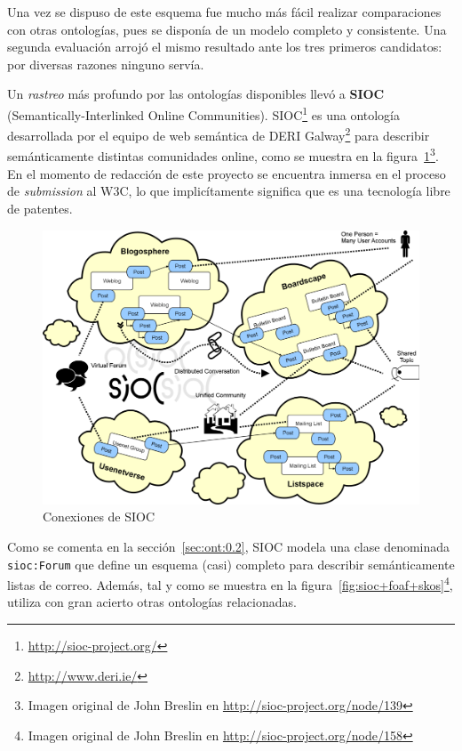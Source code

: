 Una vez se dispuso de este esquema fue mucho más fácil realizar comparaciones
con otras ontologías, pues se disponía de un modelo completo y consistente. Una 
segunda evaluación arrojó el mismo resultado ante los tres primeros candidatos:
por diversas razones ninguno servía.

Un \emph{rastreo} más profundo por las ontologías disponibles llevó a 
\textbf{SIOC}\cite{Breslin2005} (Semantically-Interlinked Online Communities). 
SIOC\footnote{\url{http://sioc-project.org/}} es una ontología desarrollada 
por el equipo de web semántica de DERI Galway\footnote{\url{http://www.deri.ie/}} 
para describir semánticamente distintas comunidades online, como se muestra en
la figura~\ref{fig:siocCloud}\footnote{Imagen original de John Breslin en 
\url{http://sioc-project.org/node/139}}. En el momento de redacción
de este proyecto se encuentra inmersa en el proceso de \emph{submission} al
W3C, lo que implicítamente significa que es una tecnología libre de patentes.

\begin{figure}[H]
	\centering
	\includegraphics[width=12cm]{images/sioc-clouds.png}
	\caption{Conexiones de SIOC}
	\label{fig:siocCloud}
\end{figure}

Como se comenta en la sección~\ref{sec:ont:0.2}, SIOC modela una clase denominada
\texttt{sioc:Forum} que define un esquema (casi) completo para describir
semánticamente listas de correo. Además, tal y como se muestra en la 
figura~\ref{fig:sioc+foaf+skos}\footnote{Imagen original de John Breslin en 
\url{http://sioc-project.org/node/158}}, utiliza con gran acierto otras ontologías 
relacionadas.


